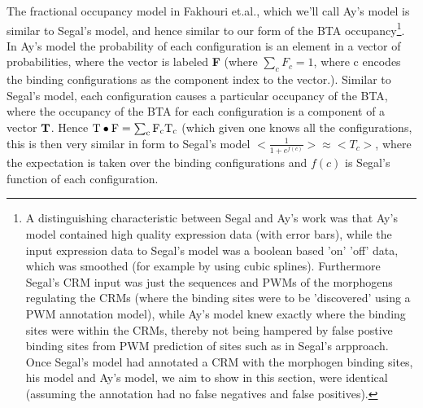 The fractional occupancy model in Fakhouri et.al.\cite{pmid20087339}, which we'll call Ay's model is similar to Segal's model, and hence similar to our form of the BTA occupancy\footnote{A distinguishing characteristic between Segal and Ay's work was that Ay's model contained high quality expression data (with error bars)\cite{}, while the input expression data to Segal's model was a boolean based 'on' 'off' data, which was smoothed (for example by using cubic splines).  Furthermore Segal's CRM input was just the sequences and PWMs of the morphogens regulating the CRMs (where the binding sites were to be 'discovered' using a PWM annotation model), while Ay's model knew exactly where the binding sites were within the CRMs, thereby not being hampered by false postive binding sites from PWM prediction of sites such as in Segal's arpproach.  Once Segal's model had annotated a CRM with the morphogen binding sites, his model and Ay's model, we aim to show in this section, were identical (assuming the annotation had no false negatives and false positives).}.  In Ay's model the probability of each configuration is an element in a vector of probabilities, where the vector is labeled \textbf{F} (where $\sum_c F_c =1$, where c encodes the binding configurations as the component index to the vector.).  Similar to Segal's model, each configuration causes a particular occupancy of the BTA, where the occupancy of the BTA for each configuration is a component of a vector $\rm \textbf{T}$.  Hence $ \rm \bm{T} \bullet \rm \bm{F} = \sum_c F_c T_c $ (which given one knows all the configurations, this is then very similar in form to Segal's model $<\frac{1}{1+e^{f(c)}}> \approx < T_c >$, where the expectation is taken over the binding configurations and $f(c)$ is Segal's function of each configuration.

